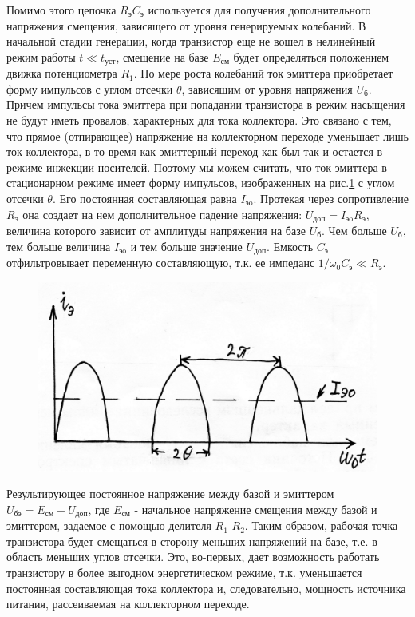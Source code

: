 Помимо этого цепочка $R_\text{э}C_\text{э}$ используется для получения дополнительного напряжения смещения, зависящего от уровня генерируемых колебаний. В начальной стадии генерации, когда транзистор еще не вошел в нелинейный режим работы $t\ll t_\text{уст}$, смещение на базе $E_\text{см}$ будет определяться положением движка потенциометра $R_1$. По мере роста колебаний ток эмиттера приобретает форму импульсов с углом отсечки $\theta$, зависящим от уровня напряжения $U_\text{б}$. Причем импульсы тока эмиттера при попадании транзистора в режим насыщения не будут иметь провалов, характерных для тока коллектора. Это связано с тем, что прямое (отпирающее) напряжение на коллекторном переходе уменьшает лишь ток коллектора, в то время как эмиттерный переход как был так и остается в режиме инжекции носителей. Поэтому мы можем считать, что ток эмиттера в стационарном режиме имеет форму импульсов, изображенных на рис.\ref{fig:fig15} с углом отсечки $\theta$. Его постоянная составляющая равна $I_{\text{эo}}$. Протекая через сопротивление $R_\text{э}$ она создает на нем дополнительное падение напряжения: $U_\text{доп}=I_{\text{эo}}R_\text{э}$, величина которого зависит от амплитуды напряжения на базе $U_\text{б}$. Чем больше $U_\text{б}$, тем больше величина $I_{\text{эo}}$ и тем больше значение $U_\text{доп}$. Емкость $C_\text{э}$ отфильтровывает переменную составляющую, т.к. ее импеданс $1/\omega_0 C_\text{э}\ll R_\text{э}$.

\begin{figure}
\includegraphics[width=\linewidth]{circuit/fig15}
\caption{}
\label{fig:fig15}
\vspace{-20pt}
\end{figure}

Результирующее постоянное напряжение между базой и эмиттером $U_\text{бэ}=E_\text{см}-U_\text{доп}$, где $E_\text{см}$ - начальное напряжение смещения между базой и эмиттером, задаемое с помощью делителя $R_1$ \textdiv $R_2$. Таким образом, рабочая точка транзистора будет смещаться в сторону меньших напряжений на базе, т.е. в область меньших углов отсечки. Это, во-первых, дает возможность работать транзистору в более выгодном энергетическом режиме, т.к. уменьшается постоянная составляющая тока коллектора и, следовательно, мощность источника питания, рассеиваемая на коллекторном переходе.

